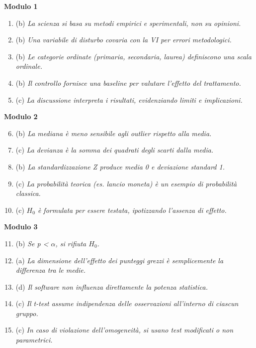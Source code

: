 \documentclass[12pt, a4paper]{article}
\begin{document}
\begin{footnotesize}
\begin{multicols}{2} %
\textbf{Modulo 1}
\begin{enumerate}
    \item (b) \textit{La scienza si basa su metodi empirici e sperimentali, non su opinioni.}
    \item (b) \textit{Una variabile di disturbo covaria con la VI per errori metodologici.}
    \item (b) \textit{Le categorie ordinate (primaria, secondaria, laurea) definiscono una scala ordinale.}
    \item (b) \textit{Il controllo fornisce una baseline per valutare l'effetto del trattamento.}
    \item (c) \textit{La discussione interpreta i risultati, evidenziando limiti e implicazioni.}
\end{enumerate}
\vspace{0.5cm}
\textbf{Modulo 2}
\begin{enumerate}
    \setcounter{enumi}{5}
    \item (b) \textit{La mediana è meno sensibile agli outlier rispetto alla media.}
    \item (c) \textit{La devianza è la somma dei quadrati degli scarti dalla media.}
    \item (b) \textit{La standardizzazione Z produce media 0 e deviazione standard 1.}
    \item (c) \textit{La probabilità teorica (es. lancio moneta) è un esempio di probabilità classica.}
    \item (c) \textit{$H_0$ è formulata per essere testata, ipotizzando l'assenza di effetto.}
\end{enumerate}
\vspace{0.5cm}
\textbf{Modulo 3}
\begin{enumerate}
    \setcounter{enumi}{10}
    \item (b) \textit{Se p < $\alpha$, si rifiuta $H_0$.}
    \item (a) \textit{La dimensione dell'effetto dei punteggi grezzi è semplicemente la differenza tra le medie.}
    \item (d) \textit{Il software non influenza direttamente la potenza statistica.}
    \item (c) \textit{Il t-test assume indipendenza delle osservazioni all'interno di ciascun gruppo.}
    \item (c) \textit{In caso di violazione dell'omogeneità, si usano test modificati o non parametrici.}

\end{enumerate}
\end{multicols}
\end{footnotesize}
\end{document}
